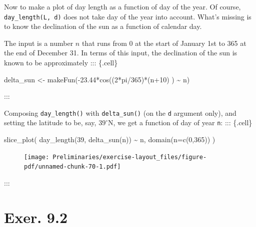 \documentclass[
  letterpaper,
  DIV=11,
  numbers=noendperiod,
  oneside]{article}
\newenvironment{Shaded}{\begin{snugshade}}{\end{snugshade}}
\newcommand{\AttributeTok}[1]{\textcolor[rgb]{0.40,0.45,0.13}{#1}}
\newcommand{\DecValTok}[1]{\textcolor[rgb]{0.68,0.00,0.00}{#1}}
\newcommand{\FloatTok}[1]{\textcolor[rgb]{0.68,0.00,0.00}{#1}}
\newcommand{\FunctionTok}[1]{\textcolor[rgb]{0.28,0.35,0.67}{#1}}
\newcommand{\NormalTok}[1]{\textcolor[rgb]{0.00,0.23,0.31}{#1}}
\newcommand{\OtherTok}[1]{\textcolor[rgb]{0.00,0.23,0.31}{#1}}
\newcommand{\SpecialCharTok}[1]{\textcolor[rgb]{0.37,0.37,0.37}{#1}}
\begin{document}
\begin{multicols}{2}
Now to make a plot of day length as a function of day of the year. Of
course, \texttt{day\_length(L,\ d)} does not take day of the year into
account. What's missing is to know the declination of the sun as a
function of calendar day.

The input is a number \(n\) that runs from 0 at the start of January 1st
to 365 at the end of December 31. In terms of this input, the
declination of the sun is known to be approximately ::: \{.cell\}

\begin{Shaded}
\begin{Highlighting}[]
\NormalTok{delta\_sun }\OtherTok{\textless{}{-}} \FunctionTok{makeFun}\NormalTok{(}\SpecialCharTok{{-}}\FloatTok{23.44}\SpecialCharTok{*}\FunctionTok{cos}\NormalTok{((}\DecValTok{2}\SpecialCharTok{*}\NormalTok{pi}\SpecialCharTok{/}\DecValTok{365}\NormalTok{)}\SpecialCharTok{*}\NormalTok{(n}\SpecialCharTok{+}\DecValTok{10}\NormalTok{) ) }\SpecialCharTok{\textasciitilde{}}\NormalTok{ n)}
\end{Highlighting}
\end{Shaded}

:::

Composing \texttt{day\_length()} with \texttt{delta\_sun()} (on the
\texttt{d} argument only), and setting the latitude to be, say,
\(39^\circ\)N, we get a function of day of year \texttt{n}: :::
\{.cell\}

\begin{Shaded}
\begin{Highlighting}[]
\FunctionTok{slice\_plot}\NormalTok{(}
  \FunctionTok{day\_length}\NormalTok{(}\DecValTok{39}\NormalTok{, }\FunctionTok{delta\_sun}\NormalTok{(n)) }\SpecialCharTok{\textasciitilde{}}\NormalTok{ n, }
  \FunctionTok{domain}\NormalTok{(}\AttributeTok{n=}\FunctionTok{c}\NormalTok{(}\DecValTok{0}\NormalTok{,}\DecValTok{365}\NormalTok{))}
\NormalTok{  )}
\end{Highlighting}
\end{Shaded}

\begin{figure}[H]

{\centering \texttt{[image: Preliminaries/exercise-layout\_files/figure-pdf/unnamed-chunk-70-1.pdf]}

}

\end{figure}

:::

\hypertarget{exer.-9.2}{%
\section*{Exer. 9.2}\label{exer.-9.2}}


\end{multicols}
\end{document}

